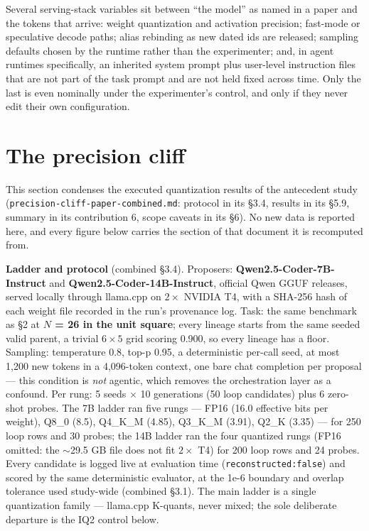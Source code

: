 \documentclass[11pt]{article}
\begin{document}
Several serving-stack variables sit between ``the model'' as named in a paper and the
tokens that arrive: weight quantization and activation precision; fast-mode or
speculative decode paths; alias rebinding as new dated ids are released; sampling
defaults chosen by the runtime rather than the experimenter; and, in agent runtimes
specifically, an inherited system prompt plus user-level instruction files that are not
part of the task prompt and are not held fixed across time. Only the last is even
nominally under the experimenter's control, and only if they never edit their own
configuration.

\section{The precision cliff}

This section condenses the executed quantization results of the antecedent study
(\texttt{precision-cliff-paper-combined.md}: protocol in its \S3.4, results in its \S5.9,
summary in its contribution 6, scope caveats in its \S6). No new data is reported here,
and every figure below carries the section of that document it is recomputed from.

\textbf{Ladder and protocol} (combined \S3.4). Proposers: \textbf{Qwen2.5-Coder-7B-Instruct} and
\textbf{Qwen2.5-Coder-14B-Instruct}, official Qwen GGUF releases, served locally through
llama.cpp on $2 \times$ NVIDIA T4, with a SHA-256 hash of each weight file recorded in the run's
provenance log. Task: the same benchmark as \S2 at \textbf{$N$ = 26 in the unit square}; every
lineage starts from the same seeded valid parent, a trivial $6 \times 5$ grid scoring 0.900, so
every lineage has a floor. Sampling: temperature 0.8, top-p 0.95, a deterministic
per-call seed, at most 1,200 new tokens in a 4,096-token context, one bare chat
completion per proposal --- this condition is \emph{not} agentic, which removes the
orchestration layer as a confound. Per rung: 5 seeds $\times$ 10 generations (50 loop
candidates) plus 6 zero-shot probes. The 7B ladder ran five rungs --- FP16 (16.0 effective
bits per weight), Q8\_0 (8.5), Q4\_K\_M (4.85), Q3\_K\_M (3.91), Q2\_K (3.35) --- for 250 loop
rows and 30 probes; the 14B ladder ran the four quantized rungs (FP16 omitted: the
$\sim$29.5 GB file does not fit $2 \times$ T4) for 200 loop rows and 24 probes. Every candidate is
logged live at evaluation time (\texttt{reconstructed:false}) and scored by the same
deterministic evaluator, at the 1e-6 boundary and overlap tolerance used study-wide
(combined \S3.1). The main ladder is a single quantization family --- llama.cpp K-quants,
never mixed; the sole deliberate departure is the IQ2 control below.
\end{document}
